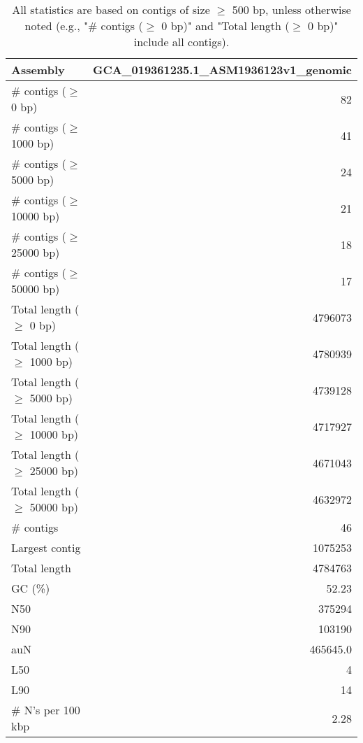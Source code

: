 \documentclass[12pt,a4paper]{article}
\begin{document}
\begin{table}[ht]
\begin{center}
\caption{All statistics are based on contigs of size $\geq$ 500 bp, unless otherwise noted (e.g., "\# contigs ($\geq$ 0 bp)" and "Total length ($\geq$ 0 bp)" include all contigs).}
\begin{tabular}{|l*{1}{|r}|}
\hline
Assembly & GCA\_019361235.1\_ASM1936123v1\_genomic \\ \hline
\# contigs ($\geq$ 0 bp) & 82 \\ \hline
\# contigs ($\geq$ 1000 bp) & 41 \\ \hline
\# contigs ($\geq$ 5000 bp) & 24 \\ \hline
\# contigs ($\geq$ 10000 bp) & 21 \\ \hline
\# contigs ($\geq$ 25000 bp) & 18 \\ \hline
\# contigs ($\geq$ 50000 bp) & 17 \\ \hline
Total length ($\geq$ 0 bp) & 4796073 \\ \hline
Total length ($\geq$ 1000 bp) & 4780939 \\ \hline
Total length ($\geq$ 5000 bp) & 4739128 \\ \hline
Total length ($\geq$ 10000 bp) & 4717927 \\ \hline
Total length ($\geq$ 25000 bp) & 4671043 \\ \hline
Total length ($\geq$ 50000 bp) & 4632972 \\ \hline
\# contigs & 46 \\ \hline
Largest contig & 1075253 \\ \hline
Total length & 4784763 \\ \hline
GC (\%) & 52.23 \\ \hline
N50 & 375294 \\ \hline
N90 & 103190 \\ \hline
auN & 465645.0 \\ \hline
L50 & 4 \\ \hline
L90 & 14 \\ \hline
\# N's per 100 kbp & 2.28 \\ \hline
\end{tabular}
\end{center}
\end{table}
\end{document}
